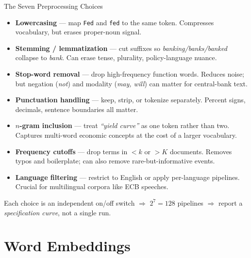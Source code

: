 \begin{frame}{The Seven Preprocessing Choices}
\small
\begin{itemize}
\item \textbf{Lowercasing} --- map \texttt{Fed} and \texttt{fed} to the same token. Compresses vocabulary, but erases proper-noun signal.
\item \textbf{Stemming / lemmatization} --- cut suffixes so \emph{banking/banks/banked} collapse to \emph{bank}. Can erase tense, plurality, policy-language nuance.
\item \textbf{Stop-word removal} --- drop high-frequency function words. Reduces noise; but negation (\emph{not}) and modality (\emph{may, will}) can matter for central-bank text.
\item \textbf{Punctuation handling} --- keep, strip, or tokenize separately. Percent signs, decimals, sentence boundaries all matter.
\item \textbf{$n$-gram inclusion} --- treat \emph{``yield curve''} as one token rather than two. Captures multi-word economic concepts at the cost of a larger vocabulary.
\item \textbf{Frequency cutoffs} --- drop terms in $<k$ or $>K$ documents. Removes typos and boilerplate; can also remove rare-but-informative events.
\item \textbf{Language filtering} --- restrict to English or apply per-language pipelines. Crucial for multilingual corpora like ECB speeches.
\end{itemize}

\smallskip
Each choice is an independent on/off switch $\Rightarrow$ $2^{7} = 128$ pipelines $\Rightarrow$ report a \emph{specification curve}, not a single run.
\end{frame}

\section{Word Embeddings}

